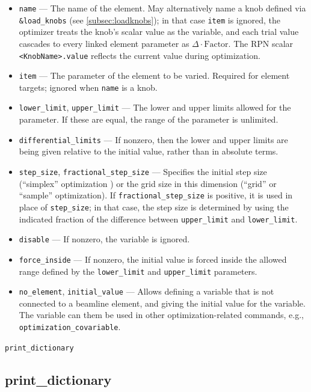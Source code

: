 \documentclass[11pt]{article}
\begin{document}
\begin{itemize}
\item \verb|name| --- The name of the element.  May alternatively name a knob defined via
 \verb|&load_knobs| (see \ref{subsec:loadknobs}); in that case \verb|item| is ignored, the optimizer
 treats the knob's scalar value as the variable, and each trial value cascades to every linked
 element parameter as $\Delta\cdot\textrm{Factor}$.  The RPN scalar
 \verb|<KnobName>.value| reflects the current value during optimization.
\item \verb|item| --- The parameter of the element to be varied.  Required for element targets;
 ignored when \verb|name| is a knob.
\item \verb|lower_limit|, \verb|upper_limit| --- The lower and upper limits allowed for the parameter.  If these are
equal, the range of the parameter is unlimited.
\item \verb|differential_limits| --- If nonzero, then the lower and upper limits are being given relative to the initial value,
  rather than in absolute terms.
\item \verb|step_size|, \verb|fractional_step_size| --- Specifies the initial step size (``simplex'' optimization ) or the grid size in
  this dimension (``grid'' or ``sample'' optimization). If  \verb|fractional_step_size| is positive, it is used in place of
  \verb|step_size|; in that case, the step size is determined by using the indicated fraction of the difference between \verb|upper_limit|
  and \verb|lower_limit|.
\item \verb|disable| --- If nonzero, the variable is ignored.
\item \verb|force_inside| --- If nonzero, the initial value is forced inside the allowed range defined by the \verb|lower_limit| and \verb|upper_limit| parameters.
\item \verb|no_element|, \verb|initial_value|  --- Allows defining a variable that is not connected to a beamline element, and giving
  the initial value for the variable. The variable can them be used in other optimization-related commands, e.g., 
  \verb|optimization_covariable|.
\end{itemize}

\newpage
\begin{center}{\Large\verb|print_dictionary|}\end{center}
\subsection{print\_dictionary \label{subsec:printdictionary}}
\end{document}
